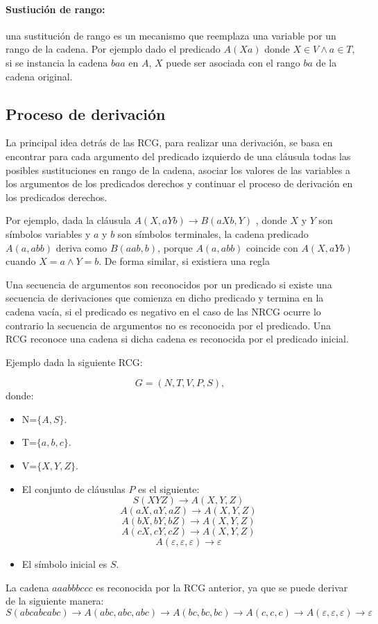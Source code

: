 \documentclass[12pt]{article}
\begin{document}
\paragraph{Sustiución de rango:} una sustitución de rango es un mecanismo que reemplaza una variable por un rango de la cadena.
Por ejemplo dado el predicado $A(Xa)$ donde $X \in V \wedge a \in T$, si se instancia la cadena $baa$ en $A$, $X$ puede
ser asociada con el rango $ba$ de la cadena original.

\subsection{Proceso de derivación}

La principal idea detrás de las RCG, para realizar una derivación, se basa en encontrar para cada argumento del predicado izquierdo de una cláusula todas las
posibles sustituciones en rango de la cadena, asociar los valores de las variables a los argumentos de los predicados derechos y continuar
el proceso de derivación en los predicados derechos.

Por ejemplo, dada la cláusula $A(X,aYb)\to B(aXb,Y)$ , donde $X$ y $Y$ son símbolos variables y $a$ y $b$
son símbolos terminales, la cadena predicado $A(a,abb)$ deriva como $B(aab,b)$, porque $A(a,abb)$
coincide con $A(X,aYb)$ cuando $ X=a \wedge Y=b$. De forma similar, si existiera una regla

Una secuencia de argumentos son reconocidos por un predicado si existe una secuencia de derivaciones que comienza
en dicho predicado y termina en la cadena vacía, si el predicado es negativo en el caso de las NRCG ocurre lo contrario
la secuencia de argumentos no es reconocida por el predicado. Una RCG reconoce una cadena si dicha cadena es reconocida
por el predicado inicial.

Ejemplo dada la siguiente RCG:

\[
    G = (N, T, V, P, S),
\]
donde:

\begin{itemize}
    \item  N=$\{A,S\}$.
    \item T=$\{a,b,c\}$.
    \item V=$\{X,Y,Z\}$.
    \item El conjunto de cláusulas $P$ es el siguiente:
          $$S(XYZ)\to A(X,Y,Z)$$
          $$A(aX,aY,aZ)\to A(X,Y,Z)$$
          $$A(bX,bY,bZ)\to A(X,Y,Z)$$
          $$A(cX,cY,cZ)\to A(X,Y,Z)$$
          $$A(\varepsilon,\varepsilon,\varepsilon)\to \varepsilon$$
    \item El símbolo inicial es $S$.
\end{itemize}
La cadena $aaabbbccc$ es reconocida por la RCG anterior, ya que se puede derivar de la siguiente manera:
$$S(abcabcabc)\to A(abc,abc,abc)\to A(bc,bc,bc)\to A(c,c,c)\to A(\varepsilon,\varepsilon,\varepsilon)\to \varepsilon$$
\end{document}
